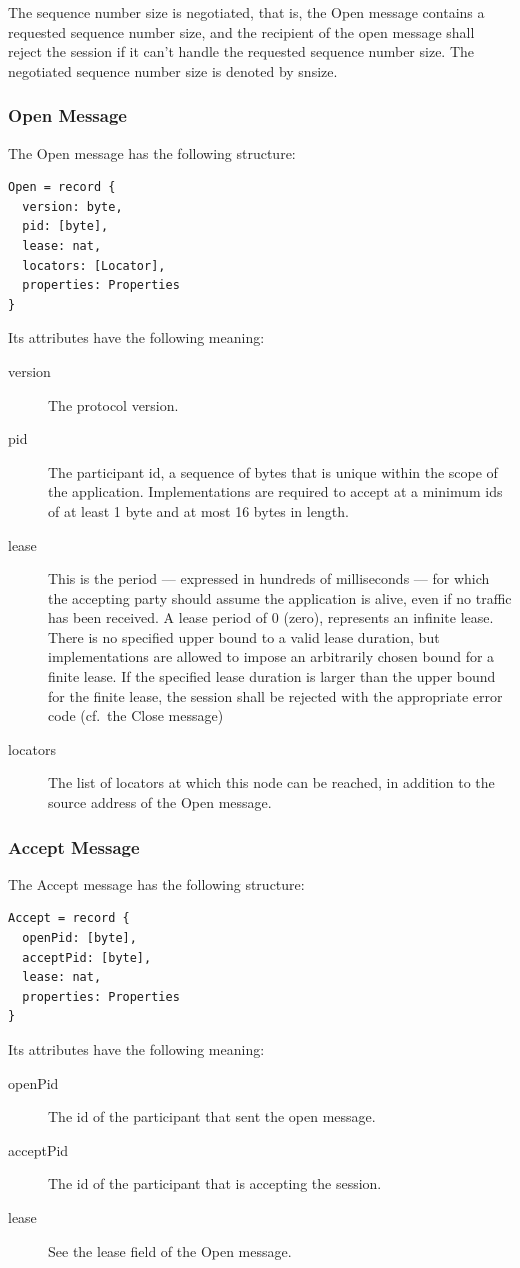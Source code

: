 \documentclass[a4paper,oneside,article]{memoir}
\begin{document}
The sequence number size is negotiated, that is, the Open message contains a requested sequence
number size, and the recipient of the open message shall reject the session if it can’t handle the
requested sequence number size.  The negotiated sequence number size is denoted by snsize.

\subsubsection{Open Message}

The Open message has the following structure:
\begin{verbatim}
Open = record {
  version: byte,
  pid: [byte],
  lease: nat,
  locators: [Locator],
  properties: Properties
}
\end{verbatim}
Its attributes have the following meaning:
\begin{description}
\item[version] The protocol version.
\item[pid] The participant id, a sequence of bytes that is unique within the scope of the
  application.  Implementations are required to accept at a minimum ids of at least 1 byte and at
  most 16 bytes in length.
\item[lease] This is the period --- expressed in hundreds of milliseconds --- for which the accepting
  party should assume the application is alive, even if no traffic has been received. A lease period
  of 0 (zero), represents an infinite lease.  There is no specified upper bound to a valid lease
  duration, but implementations are allowed to impose an arbitrarily chosen bound for a finite
  lease.  If the specified lease duration is larger than the upper bound for the finite lease, the
  session shall be rejected with the appropriate error code (cf.\  the Close message)
\item[locators] The list of locators at which this node can be reached, in addition to the source
  address of the Open message.
\end{description}

\subsubsection{Accept Message}

The Accept message has the following structure:
\begin{verbatim}
Accept = record {
  openPid: [byte],
  acceptPid: [byte],
  lease: nat,
  properties: Properties
}
\end{verbatim}
Its attributes have the following meaning:
\begin{description}
\item[openPid] The id of the participant that sent the open message.
\item[acceptPid] The id of the participant that is accepting the session.
\item[lease] See the lease field of the Open message.
\end{description}
\end{document}
